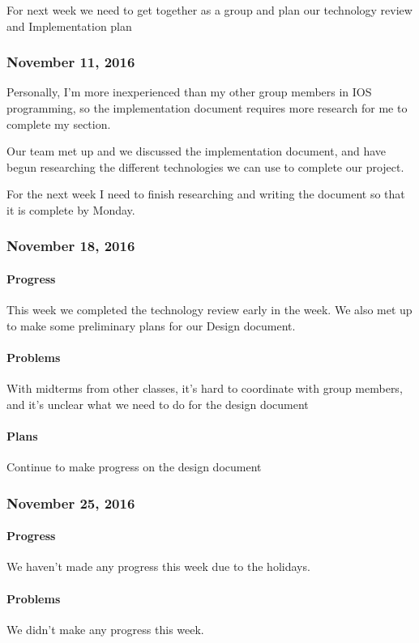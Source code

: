For next week we need to get together as a group and plan our technology
review and Implementation plan

\subsubsection{November 11, 2016}\label{section}
Personally, I'm more inexperienced than my other group members in IOS
programming, so the implementation document requires more research for
me to complete my section.

Our team met up and we discussed the implementation document, and have
begun researching the different technologies we can use to complete our
project.

For the next week I need to finish researching and writing the document
so that it is complete by Monday.

\subsubsection{November 18, 2016}\label{section}
\paragraph{Progress}\label{progress}
This week we completed the technology review early in the week. We also
met up to make some preliminary plans for our Design document.
\paragraph{Problems}\label{problems}
With midterms from other classes, it's hard to coordinate with group
members, and it's unclear what we need to do for the design document
\paragraph{Plans}\label{plans}
Continue to make progress on the design document

\subsubsection{November 25, 2016}\label{section}
\paragraph{Progress}\label{progress}
We haven't made any progress this week due to the holidays.
\paragraph{Problems}\label{problems}
We didn't make any progress this week.
